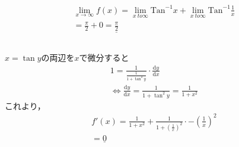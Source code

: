 \documentclass[dvipdfmx]{article}
\begin{document}
\section{}
  \subsection{}
    \begin{align*}
      \lim_{x \to \infty} f(x) = \lim_{x \ to \infty} \mathrm{Tan}^{-1} x + \lim_{x \ to \infty} \mathrm{Tan}^{-1} \frac{1}{x}\\
      = \frac{\pi}{2} + 0 = \underline{\frac{\pi}{2}}
    \end{align*}
  \subsection{}
    $x = \tan y$の両辺を$x$で微分すると
    \begin{align*}
      1 = \frac{1}{\frac{1}{1 + \tan^2 y}} \cdot \frac{\mathrm{d}y}{\mathrm{d}x}\\
      \Leftrightarrow \frac{\mathrm{d}y}{\mathrm{d}x} = \frac{1}{1 +\tan^2 y} = \frac{1}{1 + x^2}
    \end{align*}
    これより，
    \begin{align*}
      f'(x) = \frac{1}{1 + x^2} + \frac{1}{1+\left(\frac{1}{x}\right)^2}\cdot -\left(\frac{1}{x}\right)^2\\
      = \underline{0}
    \end{align*}
\end{document}
